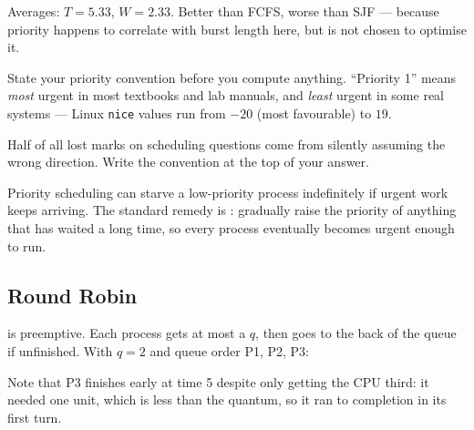 Averages: $T = 5.33$, $W = 2.33$. Better than FCFS, worse than SJF --- because priority happens to correlate with burst length here, but is not chosen to optimise it.

\begin{pitfall}
State your priority convention before you compute anything. ``Priority 1'' means \emph{most} urgent in most textbooks and lab manuals, and \emph{least} urgent in some real systems --- Linux \texttt{nice} values run from $-20$ (most favourable) to $19$.

Half of all lost marks on scheduling questions come from silently assuming the wrong direction. Write the convention at the top of your answer.
\end{pitfall}

Priority scheduling can starve a low-priority process indefinitely if urgent work keeps arriving. The standard remedy is : gradually raise the priority of anything that has waited a long time, so every process eventually becomes urgent enough to run.

\subsection{Round Robin}
 is preemptive. Each process gets at most a  $q$, then goes to the back of the queue if unfinished. With $q = 2$ and queue order P1, P2, P3:

\begin{mlfigure}
\end{mlfigure}

Note that P3 finishes early at time 5 despite only getting the CPU third: it needed one unit, which is less than the quantum, so it ran to completion in its first turn.

